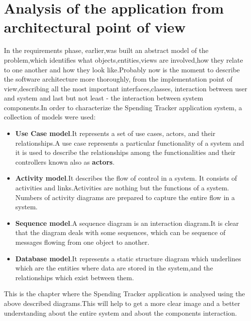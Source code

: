 \section{ Analysis of the application from architectural point of view}
In the requirements phase, earlier,was built an abstract model of the problem,which identifies what objects,entities,views are involved,how they relate to one another and how they look like.Probably now is the moment to describe the software architecture more thoroughly, from the implementation point of view,describing all the most important interfaces,classes, interaction between user and system and last but not least - the interaction between system components.In order to characterize the Spending Tracker application system, a collection of models were used:
\begin{itemize}
	\item \textbf{Use Case model}.It represents a set of use cases, actors, and their relationships.A use case represents a particular functionality of a system and it is used to describe the relationships among the functionalities and their controllers known also as \textbf{actors}.
	\item \textbf{Activity model}.It describes the flow of control in a system. It consists of activities and links.Activities are nothing but the functions of a system. Numbers of activity diagrams are prepared to capture the entire flow in a system.
	\item \textbf{Sequence model}.A sequence diagram is an interaction diagram.It is clear that the diagram deals with some sequences, which can be sequence of messages flowing from one object to another.
	\item \textbf{ Database model}.It represents a static structure diagram which underlines which are the entities where data are stored in the system,and the relationships which exist between them. \cite{UML}
\end{itemize}

This is the chapter where the Spending Tracker application is analysed using the above described diagrams.This will help to get a more clear image and a better understanding about the entire system and about the components interaction.


